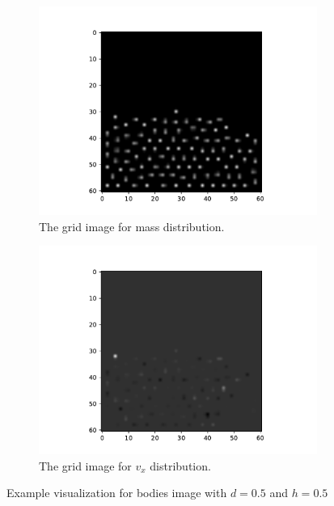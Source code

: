     \begin{figure}[!h]
        \centering
        \begin{subfigure}[b]{0.45\textwidth}
            \includegraphics[width=\textwidth]{Figures/sphmass}
            \caption{The grid image for mass distribution.}
        \end{subfigure}
        \begin{subfigure}[b]{0.45\textwidth}
            \includegraphics[width=\textwidth]{Figures/sphy}
            \caption{The grid image for $v_x$ distribution.}
        \end{subfigure}
        \caption{Example visualization for bodies image with $d=0.5$ and $h=0.5$}
        \label{fig:examsph}
    \end{figure}

